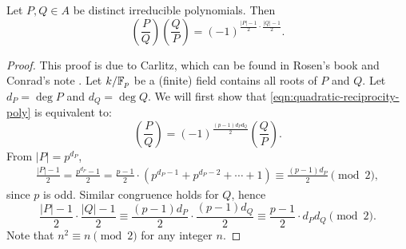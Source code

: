 \begin{theorem}
    \label{thm:quadratic-reciprocity-poly}
    Let $P, Q \in A$ be distinct irreducible polynomials.
    Then
    \begin{equation}
        \left(\frac{P}{Q}\right) \left(\frac{Q}{P}\right) = (-1)^{\frac{|P| - 1}{2} \cdot \frac{|Q| - 1}{2}}.
        \label{eqn:quadratic-reciprocity-poly}
    \end{equation}
\end{theorem}
\begin{proof}
    This proof is due to Carlitz, which can be found in Rosen's book \cite[p. 25, Theorem 3.3]{rosen2013number} and Conrad's note \cite[Section 3]{conrad_rec_odd}.
    Let $k / \mathbb{F}_p$ be a (finite) field contains all roots of $P$ and $Q$.
    Let $d_P = \deg P$ and $d_Q = \deg Q$.
    We will first show that \eqref{eqn:quadratic-reciprocity-poly} is equivalent to:
    \begin{equation}
        \left(\frac{P}{Q}\right) = (-1)^{\frac{(p-1) d_P d_Q}{2}} \left(\frac{Q}{P}\right).
        \label{eqn:quadratic-reciprocity-poly-cor}
    \end{equation} 
    From $|P| = p^{d_P}$,
    \begin{align*}
        \frac{|P| - 1}{2} = \frac{p^{d_P} - 1}{2} = \frac{p-1}{2} \cdot (p^{d_P-1} + p^{d_P-2} + \cdots + 1) \equiv \frac{(p-1) d_P}{2} \pmod{2},
    \end{align*}
    since $p$ is odd.
    Similar congruence holds for $Q$, hence
    \[
        \frac{|P| - 1}{2} \cdot \frac{|Q| - 1}{2} \equiv \frac{(p-1) d_P}{2} \cdot \frac{(p-1) d_Q}{2} \equiv \frac{p-1}{2} \cdot d_P d_Q \pmod{2}.
    \]
    Note that $n^2 \equiv n \pmod{2}$ for any integer $n$.
    

\end{proof}
